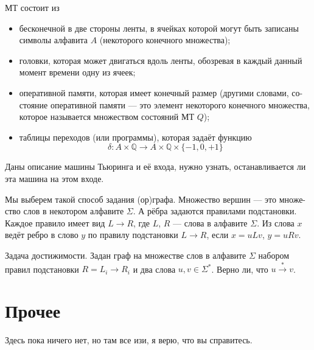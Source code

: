 \documentclass{article}
\newcommand{\Q}{\mathbb{Q}}
\newenvironment{definition}[2][Определение]{\begin{trivlist}
\item[\hskip \labelsep {\bfseries #1}\hskip \labelsep {\bfseries #2}]}{\end{trivlist}}
\begin{document}
\begin{definition}{МТ}
МТ состоит из
\begin{itemize}
\item бесконечной в две стороны ленты, в ячейках которой могут быть записаны
символы алфавита $A$ (некоторого конечного множества);
\item головки, которая может двигаться вдоль ленты, обозревая в каждый данный
момент времени одну из ячеек;
\item оперативной памяти, которая имеет конечный размер (другими словами, со-
стояние оперативной памяти — это элемент некоторого конечного множества,
которое называется множеством состояний МТ $Q$);
\item таблицы переходов (или программы), которая задаёт функцию
\[
\delta : A \times \Q \to A \times \Q \times \{-1, 0, +1\}
\]
\end{itemize}
\end{definition}

\begin{definition}{Проблема остановки}
Даны описание машины Тьюринга и её входа,
нужно узнать, останавливается ли эта машина на этом входе.
\end{definition}

\begin{definition}{Граф подстановок.}
Мы выберем такой способ задания (ор)графа. Множество вершин — это множе-
ство слов в некотором алфавите $\Sigma$. А рёбра задаются правилами подстановки. Каждое правило имеет вид
$L \to R$,
где $L$, $R$ --- слова в алфавите $\Sigma$. Из слова $x$ ведёт ребро в слово $y$ по правилу подстановки $L \to R$, если $x = uLv$, $y = uRv$.
\end{definition}

\begin{definition}{Проблема остановки.}
Задача достижимости. Задан граф на множестве слов в алфавите $\Sigma$ набором
правил подстановки $R = {L_i \to R_i}$ и два слова $u, v \in \Sigma^{*}$. 
Верно ли, что $u \stackrel{*}{\to} v$.
\end{definition}

\section{Прочее}
Здесь пока ничего нет, но там все изи, я верю, что вы справитесь.
\end{document}
